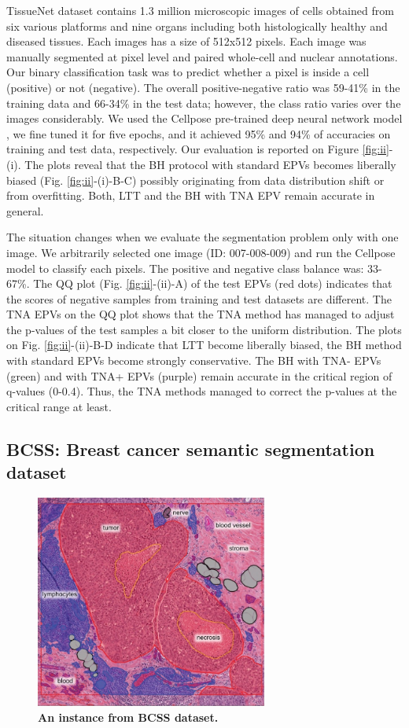 \documentclass{article}
\begin{document}
TissueNet dataset contains 1.3 million microscopic images of cells obtained from six various platforms and nine organs including both histologically healthy and diseased tissues. Each images has a size of 512x512 pixels. Each image was manually segmented at pixel level and paired whole-cell and nuclear annotations. Our binary classification task was to predict whether a pixel is inside a cell (positive) or not (negative). The overall positive-negative ratio was 59-41\% in the training data and 66-34\% in the test data; however, the class ratio varies over the images considerably. We used the Cellpose pre-trained deep neural network model \cite{cellpose}, we fine tuned it for five epochs, and it achieved 95\% and 94\% of accuracies  on training and test data, respectively. Our evaluation is reported on Figure \ref{fig:ii}-(i). The plots reveal that the BH protocol with standard EPVs becomes liberally biased (Fig. \ref{fig:ii}-(i)-B-C) possibly originating from data distribution shift or from overfitting. Both, LTT and the BH with TNA EPV remain accurate in general. 

The situation changes when we evaluate the segmentation problem only with one image. We arbitrarily selected one image (ID: 007-008-009) and run the Cellpose model to classify each pixels. The positive and negative class balance was: 33-67\%. The QQ plot (Fig. \ref{fig:ii}-(ii)-A) of the test EPVs (red dots) indicates that the scores of negative samples from training and test datasets are different. The TNA EPVs on the QQ plot shows that the TNA method has managed to adjust the p-values of the test samples a bit closer to the uniform distribution. The plots on Fig. \ref{fig:ii}-(ii)-B-D indicate that LTT become liberally biased, the BH method with standard EPVs become strongly conservative. The BH with TNA- EPVs (green) and with TNA+ EPVs (purple) remain accurate in the critical region of q-values (0-0.4). Thus, the TNA methods managed to correct the p-values at the critical range at least. 






\subsection{BCSS: Breast cancer semantic segmentation dataset}

\begin{figure}[h!]
	\centering
	\includegraphics[width=3in]{img/bcss_instance.jpeg}
	\caption{{\bf An instance from BCSS dataset.}}
	\label{fig:bcss_example}
\end{figure} 
\end{document}

